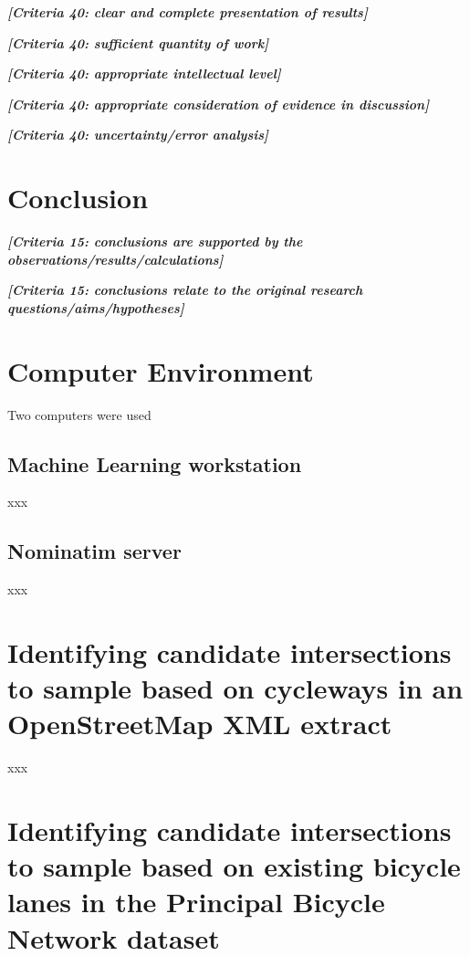 \documentclass[11pt,twoside]{report}
\newcommand{\remark}[1]{{\bf \em [\marginpar{$\Leftarrow$}#1]}}
\begin{document}
\remark{Criteria 40: clear and complete presentation of results}

\remark{Criteria 40: sufficient quantity of work}

\remark{Criteria 40: appropriate intellectual level}

\remark{Criteria 40: appropriate consideration of evidence in discussion}

\remark{Criteria 40: uncertainty/error analysis}



\chapter{Conclusion}

\remark{Criteria 15: conclusions are supported by the observations/results/calculations}

\remark{Criteria 15: conclusions relate to the original research questions/aims/hypotheses}

\appendix
\chapter{Computer Environment}
\label{a:environment}

Two computers were used

\section{Machine Learning workstation}
\label{a:computer}

xxx

\section{Nominatim server}
\label{a:nominatim}

xxx

\chapter{Identifying candidate intersections to sample based on cycleways in an OpenStreetMap XML extract}
\label{a:sample_osm}

xxx

\chapter{Identifying candidate intersections to sample based on existing bicycle lanes in the Principal Bicycle Network dataset}
\label{a:sample_pbn}
\end{document}
